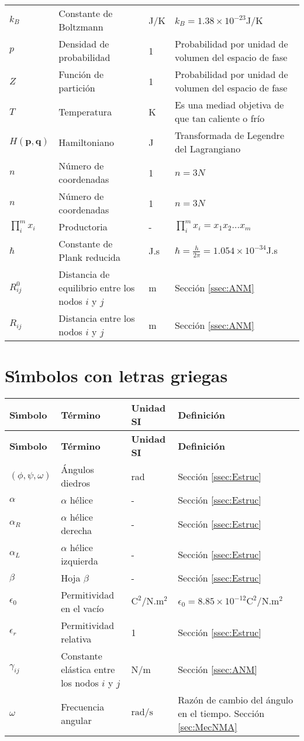 \begin{longtable}{p{2cm}p{3.5cm}p{2cm}p{8cm}}
$k_B$&Constante de Boltzmann &J/K&$k_B=1.38\times 10^{-23}$J/K\\%
$p$&Densidad de probabilidad &1 &Probabilidad por unidad de volumen del espacio de fase\\%
$Z$  &Funci\'{o}n de partici\'{o}n&1 &Probabilidad por unidad de volumen del espacio de fase\\%
$T$ &Temperatura &K &Es una mediad objetiva de que tan caliente o fr\'{i}o\\%
$H(\mathbf{p},\mathbf{q})$ &Hamiltoniano  &J &Transformada de Legendre del Lagrangiano\\%
$n$ &N\'{u}mero de coordenadas    &1 &$n=3N$\\%
$n$&N\'{u}mero de coordenadas   &1 &$n=3N$\\%
$\prod_i^m x_i$&Productoria&-&$\prod_i^m x_i=x_1x_2...x_m$\\%
$\hbar$&Constante de Plank reducida &J.s &$\hbar=\frac{h}{2\pi}=1.054\times 10^{-34}$J.s\\%
$R_{ij}^0$&Distancia de equilibrio entre los nodos $i$ y $j$ &m&Secci\'{o}n \ref{ssec:ANM}\\%
$R_{ij}$&Distancia entre los nodos $i$ y $j$ &m&Secci\'{o}n \ref{ssec:ANM}\\%
\end{longtable}
\vspace{5ex}
\section*{S\'{\i}mbolos con letras griegas}

\begin{longtable}{p{2cm}p{3.5cm}p{2cm}p{8cm}}
\textbf{S\'{\i}mbolo}&\textbf{T\'{e}rmino}&\textbf{Unidad SI}&\textbf{Definici\'{o}n}\\[0.5ex] \hline%
\endfirsthead%
\textbf{S\'{\i}mbolo}&\textbf{T\'{e}rmino}&\textbf{Unidad SI}&\textbf{Definici\'{o}n}\\[0.5ex] \hline%
\endhead%
\renewcommand{\arraystretch}{1.3}
 \label{simbolosg}
 $(\phi,\psi,\omega)$&\'{A}ngulos diedros&rad &Secci\'{o}n \ref{ssec:Estruc} \\
 $\alpha$ &$\alpha$ h\'{e}lice&- &Secci\'{o}n \ref{ssec:Estruc}\\
     $\alpha_R$&$\alpha$ h\'{e}lice derecha&- &Secci\'{o}n \ref{ssec:Estruc}\\
     $\alpha_L$&$\alpha$ h\'{e}lice izquierda&- &Secci\'{o}n \ref{ssec:Estruc} \\
  $\beta$&Hoja $\beta$&- &Secci\'{o}n \ref{ssec:Estruc} \\
  $\epsilon_0$&Permitividad en el vac\'{i}o&$\mathrm{C^2/N.m^2}$&$\epsilon_0=8.85\times 10^{-12}\mathrm{C^2/N.m^2}$ \\ 
   $\epsilon_r$&Permitividad relativa&1&Secci\'{o}n \ref{ssec:Estruc} \\
   $\gamma_{ij}$&Constante el\'{a}stica entre los nodos $i$ y $j$&N/m&Secci\'{o}n \ref{ssec:ANM} \\
   $\omega$&Frecuencia angular&$\mathrm{rad/s}$&Raz\'{o}n de cambio del \'{a}ngulo en el tiempo. Secci\'{o}n \ref{sec:MecNMA}\\%
     \hline
\end{longtable}


